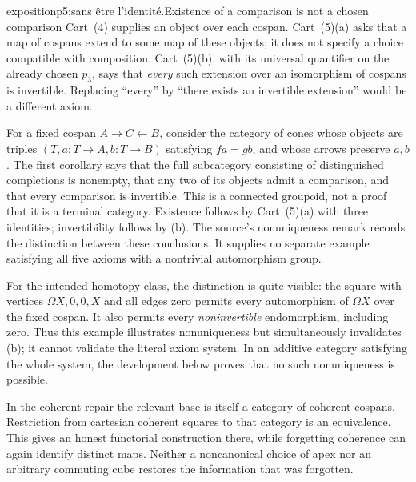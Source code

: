 \begin{dcomment}{exposition}{p5:sans être l'identité.}{Existence of a comparison is not a chosen comparison}
Cart~(4) supplies an object over each cospan. Cart~(5)(a) asks that a map of cospans extend to some map of these objects; it does not specify a choice compatible with composition. Cart~(5)(b), with its universal quantifier on the already chosen $p_3$, says that \emph{every} such extension over an isomorphism of cospans is invertible. Replacing ``every'' by ``there exists an invertible extension'' would be a different axiom.

For a fixed cospan $A\to C\leftarrow B$, consider the category of cones whose objects are triples $(T,a:T\to A,b:T\to B)$ satisfying $fa=gb$, and whose arrows preserve $a,b$. The first corollary says that the full subcategory consisting of distinguished completions is nonempty, that any two of its objects admit a comparison, and that every comparison is invertible. This is a connected groupoid, not a proof that it is a terminal category. Existence follows by Cart~(5)(a) with three identities; invertibility follows by (b). The source's nonuniqueness remark records the distinction between these conclusions. It supplies no separate example satisfying all five axioms with a nontrivial automorphism group.

For the intended homotopy class, the distinction is quite visible: the square with vertices $\Omega X,0,0,X$ and all edges zero permits every automorphism of $\Omega X$ over the fixed cospan. It also permits every \emph{noninvertible} endomorphism, including zero. Thus this example illustrates nonuniqueness but simultaneously invalidates (b); it cannot validate the literal axiom system. In an additive category satisfying the whole system, the development below proves that no such nonuniqueness is possible.

In the coherent repair the relevant base is itself a category of coherent cospans. Restriction from cartesian coherent squares to that category is an equivalence. This gives an honest functorial construction there, while forgetting coherence can again identify distinct maps. Neither a noncanonical choice of apex nor an arbitrary commuting cube restores the information that was forgotten.
\end{dcomment}

